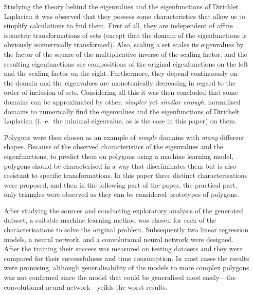 \begin{summary}
    Studying the theory behind the eigenvalues and the eigenfunctions of Dirichlet Laplacian it was observed that they possess some characteristics that allow us to simplify calculations to find them. First of all, they are independent of affine isometric transformations of sets (except that the domain of the eigenfunctions is obviously isometrically transformed). Also, scaling a set scales its eigenvalues by the factor of the square of the multiplicative inverse of the scaling factor, and the resulting eigenfunctions are compositions of the original eigenfunctions on the left and the scaling factor on the right. Furthermore, they depend continuously on the domain and the eigenvalues are monotonically decreasing in regard to the order of inclusion of sets. Considering all this it was then concluded that some domains can be approximated by other, \emph{simpler} yet \emph{similar enough}, normalised domains to numerically find the eigenvalues and the eigenfunctions of Dirichelt Laplacian (i.\ e.\ the minimal eigenvalue, as is the case in this paper) on them.

    \par

    Polygons were then chosen as an example of \emph{simple} domains with \emph{many} different shapes. Because of the observed characteristics of the eigenvalues and the eigenfunctions, to predict them on polygons using a machine learning model, polygons should be characterised in a way that discriminates them but is also resistant to specific transformations. In this paper three distinct characterisations were proposed, and then in the following part of the paper, the practical part, only triangles were observed as they can be considered prototypes of polygons.

    \par

    After studying the sources and conducting exploratory analysis of the generated dataset, a suitable machine learning method was chosen for each of the characterisations to solve the original problem. Subsequently two linear regression models, a neural network, and a convolutional neural network were designed. After the training their success was measured on testing datasets and they were compared for their successfulness and time consumption. In most cases the results were promising, although generalisability of the models to more complex polygons was not confirmed since the model that could be generalised most easily---the convolutional neural network---yeilds the worst results.

    \par
\end{summary}
